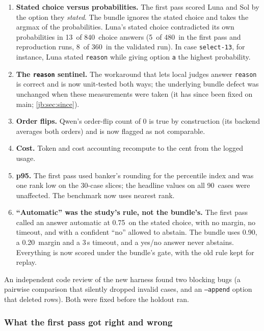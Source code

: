 \documentclass[11pt,letterpaper]{article}
\newcommand{\code}[1]{\texttt{#1}}
\newcommand{\DevN}{90}
\newcommand{\DevNFresh}{30}
\newcommand{\LunaMismatchDevK}{8}
\newcommand{\LunaMismatchDevN}{360}
\newcommand{\LunaMismatchFpK}{5}
\newcommand{\LunaMismatchFpN}{480}
\newcommand{\LunaMismatchK}{13}
\newcommand{\LunaMismatchN}{840}
\newcommand{\MinMargin}{0.20}
\newcommand{\MinP}{0.90}
\newcommand{\StudyCutoff}{0.75}
\newcommand{\TimeoutS}{3}
\begin{document}
\begin{enumerate}
  \item \textbf{Stated choice versus probabilities.} The first pass scored Luna and Sol by the option
    they \emph{stated}. The bundle ignores the stated choice and takes the argmax of the probabilities.
    Luna's stated choice contradicted its own probabilities in \LunaMismatchK\ of \LunaMismatchN\ choice
    answers (\LunaMismatchFpK\ of \LunaMismatchFpN\ in the first pass and reproduction runs,
    \LunaMismatchDevK\ of \LunaMismatchDevN\ in the validated run). In case \code{select-13}, for
    instance, Luna stated \code{reason} while giving option \code{a} the highest probability.
  \item \textbf{The \code{reason} sentinel.} The workaround that lets local judges answer \code{reason}
    is correct and is now unit-tested both ways; the underlying bundle defect was unchanged when these
    measurements were taken (it has since been fixed on main; \cref{jb:sec:since}).
  \item \textbf{Order flips.} Qwen's order-flip count of 0 is true by construction (its backend averages
    both orders) and is now flagged as not comparable.
  \item \textbf{Cost.} Token and cost accounting recompute to the cent from the logged usage.
  \item \textbf{p95.} The first pass used banker's rounding for the percentile index and was one rank
    low on the \DevNFresh-case slices; the headline values on all \DevN\ cases were unaffected. The benchmark
    now uses nearest rank.
  \item \textbf{``Automatic'' was the study's rule, not the bundle's.} The first pass called an answer
    automatic at \StudyCutoff\ on the stated choice, with no margin, no timeout, and with a confident
    ``no'' allowed to abstain. The bundle uses \MinP, a \MinMargin\ margin and a \TimeoutS\,s timeout,
    and a yes/no answer never abstains. Everything is now scored under the bundle's gate, with the old
    rule kept for replay.
\end{enumerate}
An independent code review of the new harness found two blocking bugs (a pairwise comparison that
silently dropped invalid cases, and an \code{--append} option that deleted rows). Both were fixed before
the holdout ran.

\subsubsection{What the first pass got right and wrong}
\end{document}
